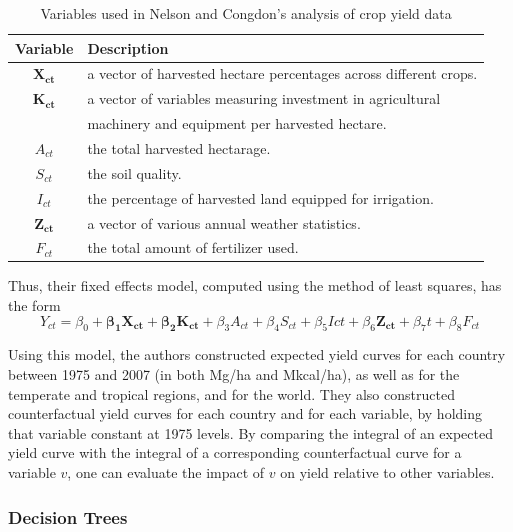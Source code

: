 \documentclass[11pt]{article}
\begin{document}
\begin{table}
\begin{tabularx}{\textwidth}{cl}
\toprule
Variable & Description \\
\midrule
$\pmb{X_{ct}}$ & a vector of harvested hectare percentages across different crops. \\
$\pmb{K_{ct}}$ & a vector of variables measuring investment in agricultural \\
& machinery and equipment per harvested hectare. \\
$A_{ct}$ & the total harvested hectarage. \\
$S_{ct}$ & the soil quality. \\
$I_{ct}$ & the percentage of harvested land equipped for irrigation. \\
$\pmb{Z_{ct}}$ & a vector of various annual weather statistics. \\
$F_{ct}$ & the total amount of fertilizer used. \\
\bottomrule
\end{tabularx}
\caption{Variables used in Nelson and Congdon's analysis of crop yield data \cite{nelson_measuring_2016}}
\label{vars}
\end{table}

Thus, their fixed effects model, computed using the method of least squares, has the form
$$Y_{ct} = \beta_0 + \pmb{\beta_1}\pmb{X_{ct}} + \pmb{\beta_2}\pmb{K_{ct}} + \beta_3A_{ct} + \beta_4S_{ct} + \beta_5I{ct} + \beta_6\pmb{Z_{ct}} + \beta_7t + \beta_8F_{ct}$$

Using this model, the authors constructed expected yield curves for each country between 1975 and 2007 (in both Mg/ha and Mkcal/ha), as well as for the temperate and tropical regions, and for the world. They also constructed counterfactual yield curves for each country and for each variable, by holding that variable constant at 1975 levels. By comparing the integral of an expected yield curve with the integral of a corresponding counterfactual curve for a variable $v$, one can evaluate the impact of $v$ on yield relative to other variables.

\subsubsection{Decision Trees}
\end{document}
